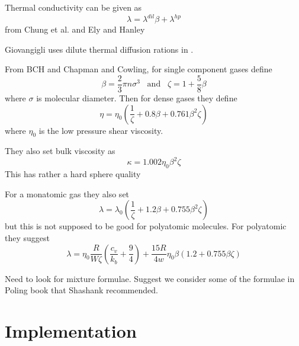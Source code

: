 \documentclass[11pt]{article}
\begin{document}
Thermal conductivity can be given as
\[
\lambda = \lambda^{dil} \beta + \lambda^{hp}
\]
from Chung et al. \cite{chung:1988} and Ely and Hanley \cite{ElyHanley:1983}

Giovangigli uses dilute thermal diffusion rations in 
\cite{giovangigli_CTM:2011}.

From BCH and Chapman and Cowling,
for single component gases define
\[
\beta = \frac {2}{3} \pi n \sigma^3 \;\;\; \mathrm{and} \;\;\; \zeta = 1+\frac{5}{8} \beta
\]
where $\sigma$ is molecular diameter.
Then for dense gases they define
\[
\eta = \eta_0 (\frac{1}{\zeta} + 0.8 \beta + 0.761 \beta^2 \zeta)
\]
where $\eta_0$ is the low pressure shear viscosity.

They also set bulk viscosity as
\[
\kappa = 1.002 \eta_0 \beta^2 \zeta
\]
This has rather a hard sphere quality

For a monatomic gas they also set
\[
\lambda = \lambda_0 (\frac{1}{\zeta} + 1.2 \beta + 0.755 \beta^2 \zeta)
\]
but this is not supposed to be good for polyatomic molecules.
For polyatomic they suggest
\[
\lambda = \eta_0 \frac{R}{W \zeta} \left(\frac{c_v}{k_b} + \frac{9}{4} \right)
+ \frac{15 R}{4 w} \eta_0 \beta \left( 1.2 + 0.755 \beta \zeta \right ) 
\]

Need to look for mixture formulae.  Suggest we consider some of the formulae in Poling book that Shashank
recommended.
    \section{Implementation}
\end{document}
